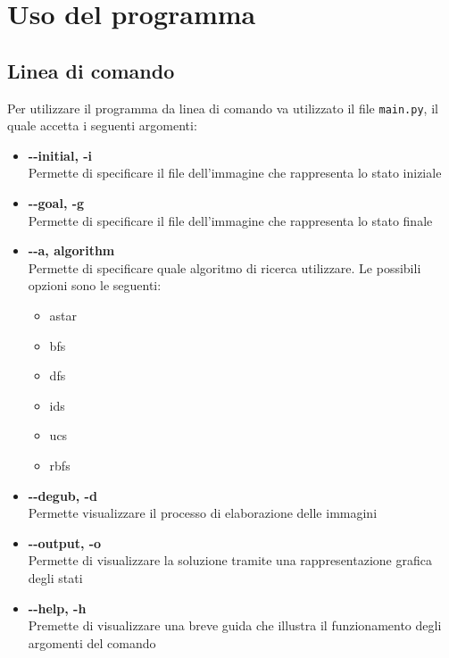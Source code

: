 \documentclass{article}
\begin{document}
	\section{Uso del programma}
	\subsection{Linea di comando}
	Per utilizzare il programma da linea di comando va utilizzato il file \verb*|main.py|, il quale accetta i seguenti argomenti:
	\begin{itemize}
		\item \textbf{-\--initial, -i}\\Permette di specificare il file dell'immagine che rappresenta lo stato iniziale
		\item \textbf{-\--goal, -g}\\Permette di specificare il file dell'immagine che rappresenta lo stato finale
		\item \textbf{-\--a, algorithm}\\Permette di specificare quale algoritmo di ricerca utilizzare. Le possibili opzioni sono le seguenti:
		\begin{itemize}
			\item astar
			\item bfs
			\item dfs
			\item ids
			\item ucs
			\item rbfs
		\end{itemize}
		\item \textbf{-\--degub, -d}\\Permette visualizzare il processo di elaborazione delle immagini
		\item \textbf{-\--output, -o}\\Permette di visualizzare la soluzione tramite una rappresentazione grafica degli stati
		\item \textbf{-\--help, -h}\\Premette di visualizzare una breve guida che illustra il funzionamento degli argomenti del comando
	\end{itemize}
	
\end{document}
